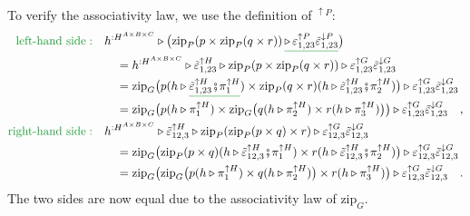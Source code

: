 To verify the associativity law, we use the definition of $^{\uparrow P}$:
\begin{align*}
{\color{greenunder}\text{left-hand side}:}\quad & h^{:H^{A\times B\times C}}\triangleright\big(\text{zip}_{P}(p\times\text{zip}_{P}(q\times r))\,\gunderline{\triangleright\,\varepsilon_{1,23}^{\uparrow P}\tilde{\varepsilon}_{1,23}^{\downarrow P}}\big)\\
 & \quad=h^{:H^{A\times B\times C}}\triangleright\tilde{\varepsilon}_{1,23}^{\uparrow H}\triangleright\text{zip}_{P}(p\times\text{zip}_{P}(q\times r))\triangleright\varepsilon_{1,23}^{\uparrow G}\tilde{\varepsilon}_{1,23}^{\downarrow G}\\
 & \quad=\text{zip}_{G}\big(p(h\triangleright\gunderline{\tilde{\varepsilon}_{1,23}^{\uparrow H}\bef\pi_{1}^{\uparrow H}})\times\text{zip}_{P}(q\times r)(h\triangleright\tilde{\varepsilon}_{1,23}^{\uparrow H}\bef\pi_{2}^{\uparrow H})\big)\triangleright\varepsilon_{1,23}^{\uparrow G}\tilde{\varepsilon}_{1,23}^{\downarrow G}\\
 & \quad=\text{zip}_{G}\big(p(h\triangleright\pi_{1}^{\uparrow H})\times\text{zip}_{G}\big(q(h\triangleright\pi_{2}^{\uparrow H})\times r(h\triangleright\pi_{3}^{\uparrow H})\big)\big)\triangleright\varepsilon_{1,23}^{\uparrow G}\tilde{\varepsilon}_{1,23}^{\downarrow G}\quad,\\
{\color{greenunder}\text{right-hand side}:}\quad & h^{:H^{A\times B\times C}}\triangleright\tilde{\varepsilon}_{12,3}^{\uparrow H}\triangleright\text{zip}_{P}(\text{zip}_{P}(p\times q)\times r)\triangleright\varepsilon_{12,3}^{\uparrow G}\tilde{\varepsilon}_{12,3}^{\downarrow G}\\
 & \quad=\text{zip}_{G}\big(\text{zip}_{P}(p\times q)(h\triangleright\tilde{\varepsilon}_{12,3}^{\uparrow H}\bef\pi_{1}^{\uparrow H})\times r(h\triangleright\tilde{\varepsilon}_{12,3}^{\uparrow H}\bef\pi_{2}^{\uparrow H})\big)\triangleright\varepsilon_{12,3}^{\uparrow G}\tilde{\varepsilon}_{12,3}^{\downarrow G}\\
 & \quad=\text{zip}_{G}\big(\text{zip}_{G}\big(p(h\triangleright\pi_{1}^{\uparrow H})\times q(h\triangleright\pi_{2}^{\uparrow H})\big)\times r(h\triangleright\pi_{3}^{\uparrow H})\big)\triangleright\varepsilon_{12,3}^{\uparrow G}\tilde{\varepsilon}_{12,3}^{\downarrow G}\quad.
\end{align*}
The two sides are now equal due to the associativity law of $\text{zip}_{G}$.

